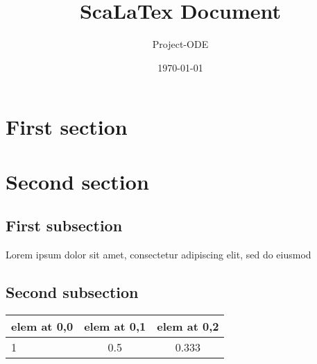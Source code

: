 \documentclass{report}
\title{ScaLaTex Document}
\date{\today}
\author{Project-ODE}
\begin{document}
\maketitle

\section{First section}

\section{Second section}

\subsection{First subsection}

Lorem ipsum dolor sit amet, consectetur adipiscing elit, sed do eiusmod

\subsection{Second subsection}

\begin{tabular}{|l|cc}

elem at 0,0 & elem at 0,1 & elem at 0,2\\
\hline
1 & 0.5 & 0.333\\

\end{tabular}
\end{document}
